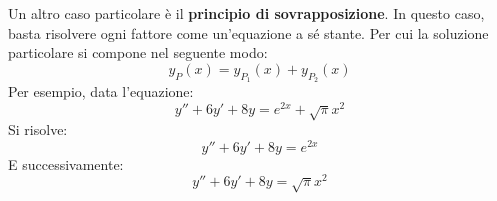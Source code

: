 \documentclass[a4paper]{article}
\begin{document}
	\noindent
	Un altro caso particolare è il \textbf{principio di sovrapposizione}. In questo caso, basta risolvere ogni fattore come un'equazione a sé stante. Per cui la soluzione particolare si compone nel seguente modo:
	\begin{equation*}
		y_{P}\left(x\right) = y_{P_{1}}\left(x\right) + y_{P_{2}}\left(x\right)
	\end{equation*}
	Per esempio, data l'equazione:
	\begin{equation*}
		y'' + 6y' + 8y = e^{2x} + \sqrt{\pi} x^{2}
	\end{equation*}
	Si risolve:
	\begin{equation*}
		y'' + 6y' + 8y = e^{2x}
	\end{equation*}
	E successivamente:
	\begin{equation*}
		y'' + 6y' + 8y = \sqrt{\pi} x^{2}
	\end{equation*}\newpage
\end{document}
